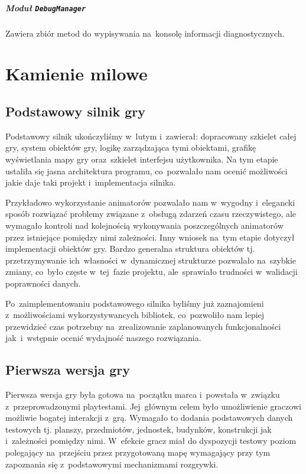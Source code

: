 \documentclass[licencjacka]{pracamgr}
\begin{document}
    \paragraph{Moduł \texttt{DebugManager}}
      Zawiera zbiór metod do wypisywania na~konsolę informacji diagnostycznych.

  \chapter{Kamienie milowe}
  \label{ch:KamienieMilowe}
    \section{Podstawowy silnik gry}
      Podstawowy silnik ukończyliśmy w~lutym i~zawierał: dopracowany szkielet całej gry, system obiektów gry, logikę
      zarządzająca tymi obiektami, grafikę wyświetlania mapy gry oraz~szkielet interfejsu użytkownika. Na tym etapie
      ustaliła się jasna architektura programu, co~pozwalało nam ocenić możliwości jakie daje taki projekt i~implementacja
      silnika.
      
      Przykładowo wykorzystanie animatorów pozwalało nam w~wygodny i~elegancki sposób rozwiązać problemy związane
      z~obsługą zdarzeń czasu rzeczywistego, ale wymagało kontroli nad kolejnością wykonywania poszczególnych
      animatorów przez istniejące pomiędzy nimi zależności. Inny wniosek na~tym etapie dotyczył implementacji obiektów gry.
      Bardzo generalna struktura obiektów tj. przetrzymywanie ich~własności w~dynamicznej strukturze pozwalało na~szybkie
      zmiany, co~było częste w~tej~fazie projektu, ale~sprawiało trudności w~walidacji poprawności danych.

      Po~zaimplementowaniu podstawowego silnika byliśmy już zaznajomieni z~możliwościami wykorzystywancych bibliotek, 
      co~pozwoliło nam lepiej przewidzieć czas potrzebny na~zrealizowanie zaplanowanych funkcjonalności jak~i~wstępnie
      ocenić wydajność naszego rozwiązania.

    \section{Pierwsza wersja gry}
      Pierwsza wersja gry była gotowa na~początku marca i~powstała w~związku z~przeprowadzonymi playtestami. Jej~głównym
      celem było umożliwienie graczowi możliwie bogatej interakcji z~grą. Wymagało to dodania podstawowych danych testowych
      tj. planszy, przedmiotów, jednostek, budynków, konstrukcji jak i~zależności pomiędzy nimi. W~efekcie gracz miał do
      dyspozycji testowy poziom polegający na~przejściu przez przygotowaną mapę wymagający przy tym zapoznania się
      z~podstawowymi mechanizmami rozgrywki.
\end{document}
